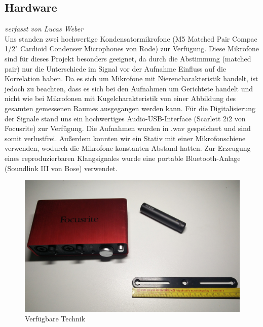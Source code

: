 \subsection{Hardware}
\small\textit{verfasst von Lucas Weber\\}
\normalsize
Uns standen zwei hochwertige Kondensatormikrofone (M5 Matched Pair Compac 1/2" Cardioid Condenser Microphones von Rode) zur Verfügung. Diese Mikrofone sind für dieses Projekt besonders geeignet, da durch die Abstimmung (matched pair) nur die Unterschiede im Signal vor der Aufnahme Einfluss auf die Korrelation haben. Da es sich um Mikrofone mit Nierencharakteristik handelt, ist jedoch zu beachten, dass es sich bei den Aufnahmen um Gerichtete handelt und nicht wie bei Mikrofonen mit Kugelcharakteristik von einer Abbildung des gesamten gemessenen Raumes ausgegangen werden kann. Für die Digitalisierung der Signale stand uns ein hochwertiges Audio-USB-Interface (Scarlett 2i2 von Focusrite) zur Verfügung. Die Aufnahmen wurden in .wav gespeichert und sind somit verlustfrei. Außerdem konnten wir ein Stativ mit einer Mikrofonschiene verwenden, wodurch die Mikrofone konstanten Abstand hatten. Zur Erzeugung eines reproduzierbaren Klangsignales wurde eine portable Bluetooth-Anlage (Soundlink III von Bose) verwendet.
\begin{figure}[ht!]
  \centering
  \includegraphics[width=\textwidth]{img/Equipment}
  \caption{Verfügbare Technik}
  \label{material}
\end{figure}
